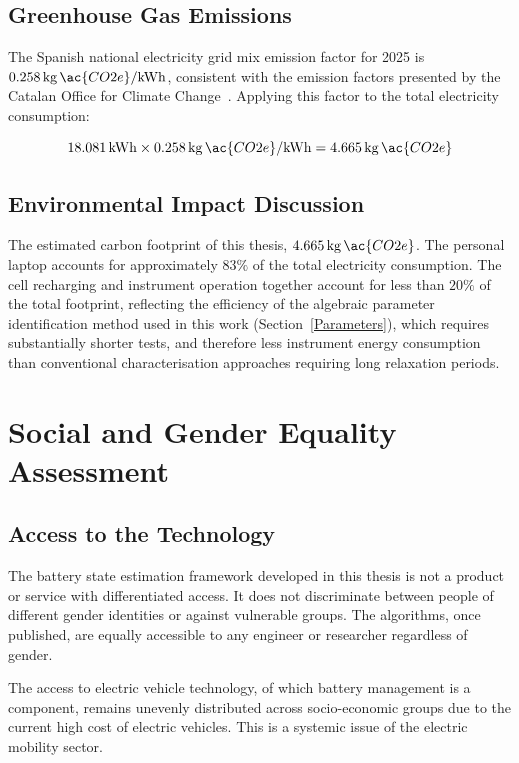 \section{Greenhouse Gas Emissions}

The Spanish national electricity grid mix emission factor for 2025 
is $0.258\,\text{kg}\,\ac{CO2e}/\text{kWh}$, 
consistent with the emission factors presented by the Catalan Office for Climate 
Change~\cite{canviclimatic}. Applying this factor to the total electricity 
consumption:

\begin{equation}
    18.081\,\text{kWh} \times 0.258\,\text{kg}\,\ac{CO2e}/\text{kWh} = 4.665\,\text{kg}\,\ac{CO2e}
\end{equation}

\section{Environmental Impact Discussion}

The estimated carbon footprint of this thesis, $4.665\,\text{kg}\,\ac{CO2e}$. 
The personal laptop accounts for approximately $83\%$ of the total electricity 
consumption. The cell 
recharging and instrument operation together account for less than $20\%$ of the 
total footprint, reflecting the efficiency of the algebraic parameter 
identification method used in this work (Section~\ref{Parameters}), which 
requires substantially shorter tests, and therefore less instrument energy 
consumption than conventional characterisation approaches requiring long 
relaxation periods.


\chapter{Social and Gender Equality Assessment}\label{sec:SocialGenderAssessment}

\section{Access to the Technology}

The battery state estimation framework developed in this thesis is not a product or service with differentiated 
access. It does not discriminate between people of different gender identities or against vulnerable 
groups. The algorithms, once published, are equally accessible to any engineer or 
researcher regardless of gender. 

The access to electric vehicle technology, of which battery management is a component, remains unevenly distributed 
across socio-economic groups due to the current high cost of electric vehicles. This 
is a systemic issue of the electric mobility sector.


